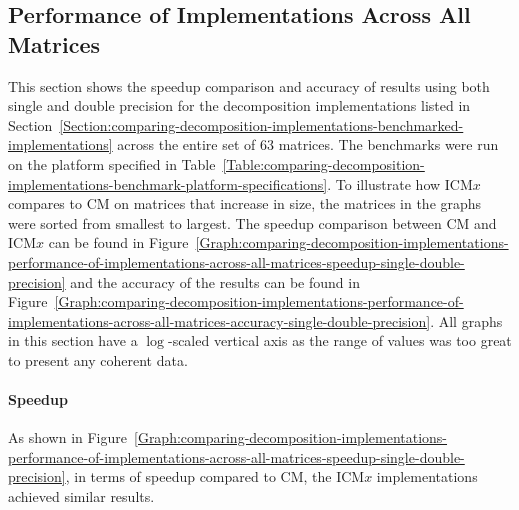 \subsection{Performance of Implementations Across All Matrices}\label{Subsection:comparing-decomposition-implementations-performance-of-implementations-across-all-matrices}
This section shows the speedup comparison and accuracy of results using both single and double precision for the decomposition implementations listed in Section~\ref{Section:comparing-decomposition-implementations-benchmarked-implementations} across the entire set of 63 matrices. The benchmarks were run on the platform specified in Table~\ref{Table:comparing-decomposition-implementations-benchmark-platform-specifications}. To illustrate how ICM$ x $ compares to CM on matrices that increase in size, the matrices in the graphs were sorted from smallest to largest. The speedup comparison between CM and ICM$ x $ can be found in Figure~\ref{Graph:comparing-decomposition-implementations-performance-of-implementations-across-all-matrices-speedup-single-double-precision} and the accuracy of the results can be found in Figure~\ref{Graph:comparing-decomposition-implementations-performance-of-implementations-across-all-matrices-accuracy-single-double-precision}. All graphs in this section have a $ \log $-scaled vertical axis as the range of values was too great to present any coherent data.

\paragraph{Speedup} As shown in Figure~\ref{Graph:comparing-decomposition-implementations-performance-of-implementations-across-all-matrices-speedup-single-double-precision}, in terms of speedup compared to CM, the ICM$ x $ implementations achieved similar results.

